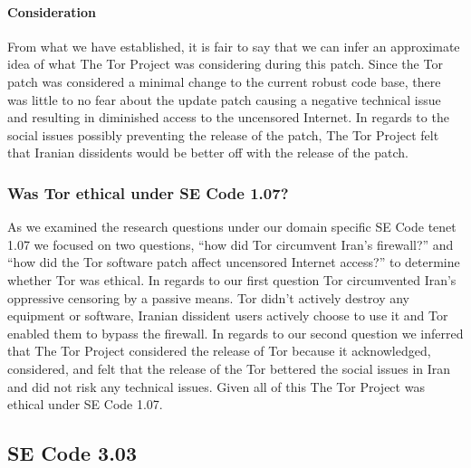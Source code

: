 \documentclass[11pt]{article}
\begin{document}
\begin{multicols}{2}
\paragraph{Consideration}

From what we have established, it is fair to say that we can infer an
approximate idea of what The Tor Project was considering during this patch.
Since the Tor patch was considered a minimal change to the current robust code
base, there was little to no fear about the update patch causing a negative
technical issue and resulting in diminished access to the uncensored Internet.
In regards to the social issues possibly preventing the release of the patch,
The Tor Project felt that Iranian dissidents would be better off with the
release of the patch.

\subsubsection{Was Tor ethical under SE Code 1.07?} 

As we examined the research questions under our domain specific SE Code tenet
1.07 we focused on two questions, ``how did Tor circumvent Iran's firewall?''
and ``how did the Tor software patch affect uncensored Internet access?'' to
determine whether Tor was ethical. In regards to our first question Tor
circumvented Iran's oppressive censoring by a passive means. Tor didn't actively
destroy any equipment or software, Iranian dissident users actively choose to
use it and Tor enabled them to bypass the firewall. In regards to our second
question we inferred that The Tor Project considered the release of Tor because
it acknowledged, considered, and felt that the release of the Tor bettered the
social issues in Iran and did not risk any technical issues. Given all of this
The Tor Project was ethical under SE Code 1.07.

\subsection{SE Code 3.03}


\end{multicols}
\end{document}

